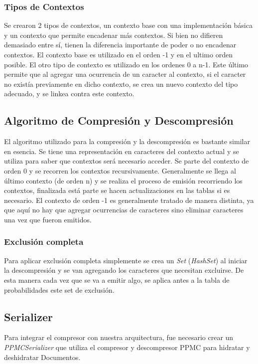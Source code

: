 \subsubsection{Tipos de Contextos}
Se crearon 2 tipos de contextos, un contexto base con una implementación básica y un contexto que permite encadenar más
contextos. Si bien no difieren demasiado entre sí, tienen la diferencia importante de poder o no encadenar contextos.
El contexto base es utilizado en el orden -1 y en el ultimo orden posible. El otro tipo de contexto es utilizado en los
ordenes 0 a n-1.
Este último permite que al agregar una ocurrencia de un caracter al contexto, si el caracter no existía previamente en
dicho contexto, se crea un nuevo contexto del tipo adecuado, y se linkea contra este contexto.

\subsection{Algoritmo de Compresión y Descompresión}
El algoritmo utilizado para la compresión y la descompresión es bastante similar en esencia. Se tiene una representación
en caracteres del contexto actual y se utiliza para saber que contextos será necesario acceder. 
Se parte del contexto de orden 0 y se recorren los contextos recursivamente. Generalmente se llega al último contexto 
(de orden n) y se realiza el proceso de emisión recorriendo los contextos, finalizada está parte se hacen 
actualizaciones en las tablas si es necesario. 
El contexto de orden -1 es generalmente tratado de manera distinta, ya que aquí no hay que agregar ocurrencias de 
caracteres sino eliminar caracteres una vez que fueron emitidos.

\subsubsection{Exclusión completa}
Para aplicar exclusión completa simplemente se crea un \textit{Set} (\textit{HashSet}) al iniciar la descompresión y se
van agregando los caracteres que necesitan excluirse. De esta manera cada vez que se va a emitir algo, se aplica antes
a la tabla de probabilidades este set de exclusión.

\subsection{Serializer}

Para integrar el compresor con nuestra arquitectura, fue necesario crear un \textit{PPMCSerializer} que utiliza el 
compresor y descompresor PPMC para hidratar y deshidratar Documentos.

